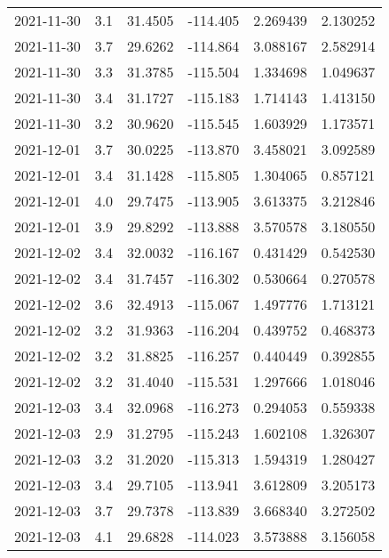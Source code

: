 \begin{tabular}{lrrrrr}
2021-11-30 &       3.1 &  31.4505 &  -114.405 &         2.269439 &         2.130252 \\
2021-11-30 &       3.7 &  29.6262 &  -114.864 &         3.088167 &         2.582914 \\
2021-11-30 &       3.3 &  31.3785 &  -115.504 &         1.334698 &         1.049637 \\
2021-11-30 &       3.4 &  31.1727 &  -115.183 &         1.714143 &         1.413150 \\
2021-11-30 &       3.2 &  30.9620 &  -115.545 &         1.603929 &         1.173571 \\
2021-12-01 &       3.7 &  30.0225 &  -113.870 &         3.458021 &         3.092589 \\
2021-12-01 &       3.4 &  31.1428 &  -115.805 &         1.304065 &         0.857121 \\
2021-12-01 &       4.0 &  29.7475 &  -113.905 &         3.613375 &         3.212846 \\
2021-12-01 &       3.9 &  29.8292 &  -113.888 &         3.570578 &         3.180550 \\
2021-12-02 &       3.4 &  32.0032 &  -116.167 &         0.431429 &         0.542530 \\
2021-12-02 &       3.4 &  31.7457 &  -116.302 &         0.530664 &         0.270578 \\
2021-12-02 &       3.6 &  32.4913 &  -115.067 &         1.497776 &         1.713121 \\
2021-12-02 &       3.2 &  31.9363 &  -116.204 &         0.439752 &         0.468373 \\
2021-12-02 &       3.2 &  31.8825 &  -116.257 &         0.440449 &         0.392855 \\
2021-12-02 &       3.2 &  31.4040 &  -115.531 &         1.297666 &         1.018046 \\
2021-12-03 &       3.4 &  32.0968 &  -116.273 &         0.294053 &         0.559338 \\
2021-12-03 &       2.9 &  31.2795 &  -115.243 &         1.602108 &         1.326307 \\
2021-12-03 &       3.2 &  31.2020 &  -115.313 &         1.594319 &         1.280427 \\
2021-12-03 &       3.4 &  29.7105 &  -113.941 &         3.612809 &         3.205173 \\
2021-12-03 &       3.7 &  29.7378 &  -113.839 &         3.668340 &         3.272502 \\
2021-12-03 &       4.1 &  29.6828 &  -114.023 &         3.573888 &         3.156058 \\

\end{tabular}
